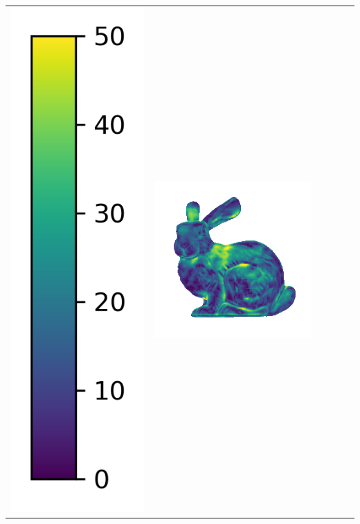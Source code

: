 \begin{tabularx}{\linewidth}{@{}Y@{}Y@{}Y@{}Y@{}Y@{}Y@{}}
\includegraphics[width=0.2\linewidth]{semisynthetic/colorbar_error_vertical.png} &
\includegraphics[width=\linewidth]{semisynthetic/20150514_14_ours_err.png} &

\end{tabularx}
